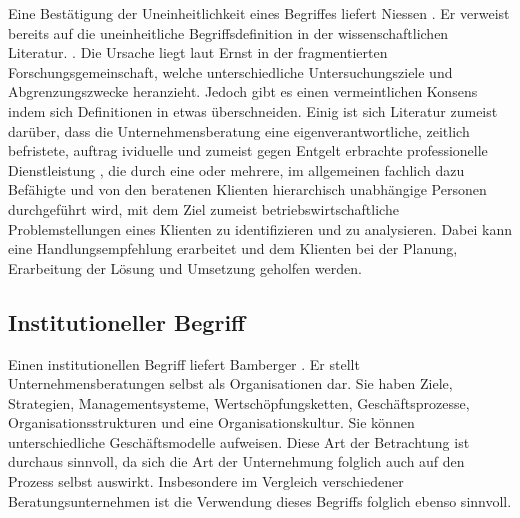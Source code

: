 Eine Bestätigung der Uneinheitlichkeit eines Begriffes liefert Niessen \cite[10]{nissen2007consulting}. Er verweist bereits auf die uneinheitliche Begriffsdefinition in der wissenschaftlichen Literatur. \cite[7]{ernst2002evaluation}. Die Ursache liegt laut Ernst \cite[10]{ernst2002evaluation} in der fragmentierten Forschungsgemeinschaft, welche unterschiedliche Untersuchungsziele und Abgrenzungszwecke heranzieht. 
Jedoch gibt es einen vermeintlichen Konsens indem sich Definitionen in etwas überschneiden. Einig ist sich Literatur  zumeist darüber, dass die Unternehmensberatung eine eigenverantwortliche, zeitlich befristete, auftrag
ividuelle und zumeist gegen Entgelt erbrachte professionelle Dienstleistung \cite[14]{Lippold201309}, die durch eine oder mehrere, im allgemeinen fachlich dazu Befähigte und von den beratenen Klienten hierarchisch unabhängige Personen durchgeführt wird, mit dem Ziel zumeist betriebswirtschaftliche Problemstellungen eines Klienten zu identifizieren und zu analysieren. Dabei kann eine Handlungsempfehlung erarbeitet und dem Klienten bei der Planung, Erarbeitung der Lösung und Umsetzung geholfen werden.  \cite[15]{nissen2007consulting}

\subsection*{Institutioneller Begriff}

Einen institutionellen Begriff liefert Bamberger \cite[16]{bamberg2008strategische}.
Er stellt Unternehmensberatungen selbst als Organisationen dar. Sie haben Ziele, Strategien, Managementsysteme, Wertschöpfungsketten, Geschäftsprozesse, Organisationsstrukturen und eine Organisationskultur. Sie können unterschiedliche Geschäftsmodelle aufweisen. Diese Art der Betrachtung ist durchaus sinnvoll, da sich die Art der Unternehmung folglich auch auf den Prozess selbst auswirkt. Insbesondere im Vergleich verschiedener Beratungsunternehmen ist die Verwendung dieses Begriffs folglich ebenso sinnvoll.

